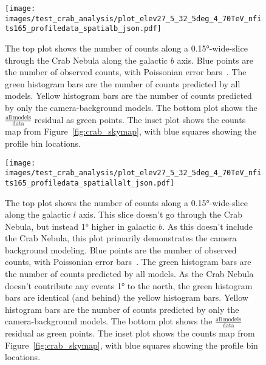   \begin{figure}[p]
    \centering
    \texttt{[image: images/test\_crab\_analysis/plot\_elev27\_5\_32\_5deg\_4\_70TeV\_nfits165\_profiledata\_spatialb\_json.pdf]}
    \caption[Crab Nebula Profile along Galactic $b$]
    {
      The top plot shows the number of counts along a \ang{0.15}-wide-slice through the Crab Nebula along the galactic $b$ axis.
      Blue points are the number of observed counts, with Poissonian error bars~\cite{poissonfrequentistinterval}.
      The green histogram bars are the number of counts predicted by all models.
      Yellow histogram bars are the number of counts predicted by only the camera-background models.
      The bottom plot shows the $\frac{\mathrm{all\:models}}{\mathrm{data}}$ residual as green points.
      The inset plot shows the counts map from Figure~\ref{fig:crab_skymap}, with blue squares showing the profile bin locations.
    }
    \label{fig:crab_profile_b}
  \end{figure}
    
  \begin{figure}[p]
    \centering
    \texttt{[image: images/test\_crab\_analysis/plot\_elev27\_5\_32\_5deg\_4\_70TeV\_nfits165\_profiledata\_spatiallalt\_json.pdf]}
    \caption[Crab Nebula Profile along Galactic $l$ Off Source]
    {
      The top plot shows the number of counts along a \ang{0.15}-wide-slice along the galactic $l$ axis.
      This slice doesn't go through the Crab Nebula, but instead \ang{1} higher in galactic $b$.
      As this doesn't include the Crab Nebula, this plot primarily demonstrates the camera background modeling.
      Blue points are the number of observed counts, with Poissonian error bars~\cite{poissonfrequentistinterval}.
      The green histogram bars are the number of counts predicted by all models.
      As the Crab Nebula doesn't contribute any events \ang{1} to the north, the green histogram bars are identical (and behind) the yellow histogram bars.
      Yellow histogram bars are the number of counts predicted by only the camera-background models.
      The bottom plot shows the $\frac{\mathrm{all\:models}}{\mathrm{data}}$ residual as green points.
      The inset plot shows the counts map from Figure~\ref{fig:crab_skymap}, with blue squares showing the profile bin locations.
    }
    \label{fig:crab_profile_l_off}
  \end{figure}

